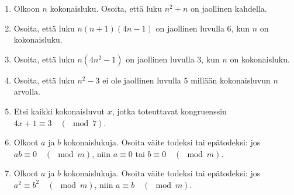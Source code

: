 \begin{enumerate}
\item Olkoon $n$ kokonaisluku. Osoita, että luku $n^2 + n$ on jaollinen kahdella.

\item Osoita, että luku $n(n + 1)(4n - 1)$ on jaollinen luvulla 6, kun $n$ on kokonaisluku.

\item Osoita, että luku $n(4n^2 - 1)$ on jaollinen luvulla 3, kun $n$ on kokonaisluku.

\item Osoita, että luku $n^2 - 3$ ei ole jaollinen luvulla 5 millään kokonaisluvun $n$ arvolla.

\item
Etsi kaikki kokonaisluvut $x$, jotka toteuttavat kongruenssin $4x+1\equiv 3\quad (\mod 7)$.

\item
Olkoot $a$ ja $b$ kokonaislukuja. Osoita väite todeksi tai epätodeksi: jos $ab \equiv 0 \quad (\mod m)$, niin $a \equiv 0$ tai $b\equiv 0 \quad (\mod m)$.

\item
Olkoot $a$ ja $b$ kokonaislukuja. Osoita väite todeksi tai epätodeksi: jos $a^2 \equiv b^2 \quad (\mod m)$, niin $a \equiv b \quad (\mod m)$.


\end{enumerate}
